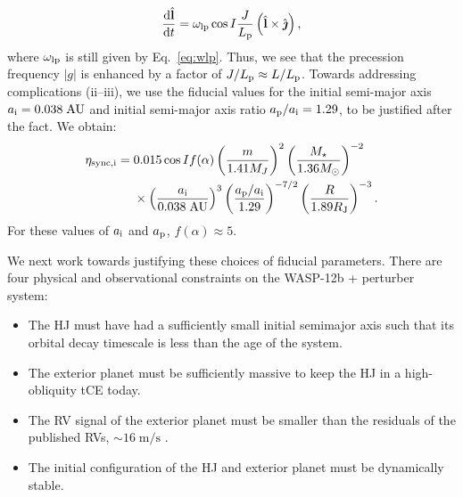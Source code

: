 \documentclass[
        fleqn,
        usenatbib,
        referee,
    ]{mnras}
\newcommand*{\rd}[2]{\frac{\mathrm{d}#1}{\mathrm{d}#2}}
\newcommand*{\abs}[1]{\left|#1\right|}
\newcommand*{\p}[1]{\left(#1\right)}
\newcommand*{\uv}[1]{\hat{\boldsymbol{\mathbf{#1}}}}
\begin{document}
\begin{equation}
    \rd{\uv{l}}{t} = \omega_{\rm lp}\cos I \frac{J}{L_{\rm p}}
        \p{\uv{l} \times \uv{\jmath}},
        \label{eq:wasp12b_g}
\end{equation}
where $\omega_{\rm lp}$ is still given by Eq.~\eqref{eq:wlp}. Thus, we see that
the precession frequency $\abs{g}$ is enhanced by a factor of $J / L_{\rm p}
\approx L / L_{\rm p}$. Towards addressing complications (ii--iii),%
we use the fiducial values for the initial semi-major axis $a_{\rm i} =
0.038\;\mathrm{AU}$ and initial semi-major axis ratio $a_{\rm p} / a_{\rm i} =
1.29$, to be justified after the fact. We obtain:
\begin{align}
    \eta_{\rm sync, i} ={}& 0.015 \cos I f(\alpha)
            \p{\frac{m}{1.41M_J}}^2
            \p{\frac{M_\star}{1.36M_{\odot}}}^{-2}
            \nonumber\\
        &\times
            \p{\frac{a_{\rm i}}{0.038\;\mathrm{AU}}}^{3}
            \p{\frac{a_{\rm p} / a_{\rm i}}{1.29}}^{-7/2}
            \p{\frac{R}{1.89R_{\rm J}}}^{-3}.\label{eq:hj_etasync}
\end{align}
For these values of $a_{\rm i}$ and $a_{\rm p}$, $f(\alpha) \approx 5$.

We next work towards justifying these choices of fiducial parameters. There are
four physical and observational constraints on the WASP-12b + perturber system:
\begin{itemize}
    \item The HJ must have had a sufficiently small initial semimajor axis such
        that its orbital decay timescale is less than the age of the system.

    \item The exterior planet must be sufficiently massive to keep the HJ in a
        high-obliquity tCE today.

    \item The RV signal of the exterior planet must be smaller than the
        residuals of the published RVs, $\sim 16\;\mathrm{m/s}$
        \citep{hebb2009wasp, husnoo2011orbital, knutson2014friends,
        bonomo2017gaps}.

    \item The initial configuration of the HJ and exterior planet must be
        dynamically stable.
\end{itemize}
\end{document}
